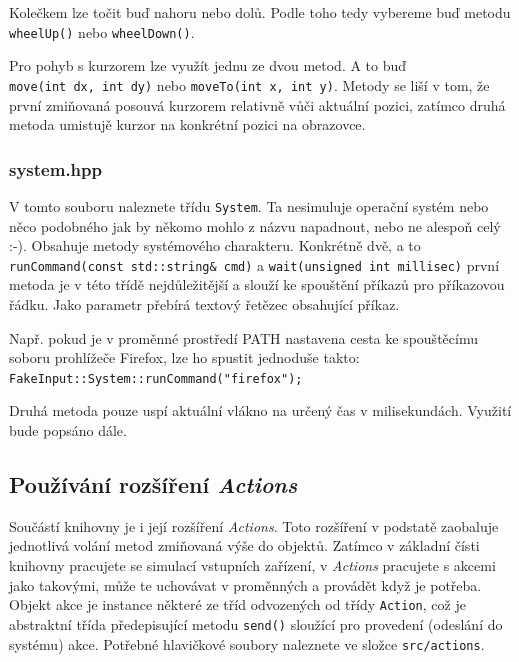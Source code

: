 \documentclass[12pt]{article}
\newcommand{\code}[1]{\texttt{#1}}
\begin{document}
    Kolečkem lze točit buď nahoru nebo dolů. Podle toho tedy vybereme buď metodu \code{wheelUp()} nebo \code{wheelDown()}.

    Pro pohyb s kurzorem lze využít jednu ze dvou metod. A to buď\\ \code{move(int dx, int dy)} nebo \code{moveTo(int x, int y)}. Metody se liší v tom, že první zmiňovaná posouvá kurzorem relativně vůči aktuální pozici, zatímco druhá metoda umistujě kurzor na konkrétní pozici na obrazovce.

    \subsubsection{system.hpp}
    V tomto souboru naleznete třídu \code{System}. Ta nesimuluje operační systém nebo něco podobného jak by někomo mohlo z názvu napadnout, nebo ne alespoň celý :-). Obsahuje metody systémového charakteru. Konkrétně dvě, a to \code{runCommand(const std::string\& cmd)} a \code{wait(unsigned int millisec)} první metoda je v této třídě nejdůležitější a slouží ke spouštění příkazů pro příkazovou řádku. Jako parametr přebírá textový řetězec obsahující příkaz.
    
        \begin{center}
            \begin{minipage}{0.7\textwidth}
                Např. pokud je v proměnné prostředí PATH nastavena cesta ke spouštěcímu soboru prohlížeče Firefox,
                lze ho spustit jednoduše takto:
                \code{FakeInput::System::runCommand("firefox");}
            \end{minipage}
        \end{center}

    Druhá metoda pouze uspí aktuální vlákno na určený čas v milisekundách. Využití bude popsáno dále.

    \subsection{Používání rozšíření \emph{Actions}}
    Součástí knihovny je i její rozšíření \emph{Actions}. Toto rozšíření v podstatě zaobaluje jednotlivá volání metod zmiňovaná výše do objektů. Zatímco v základní čísti knihovny pracujete se simulací vstupních zařízení, v \emph{Actions} pracujete s akcemi jako takovými, může te uchovávat v proměnných a provádět když je potřeba. Objekt akce je instance některé ze tříd odvozených od třídy \code{Action}, což je abstraktní třída předepisující metodu \code{send()} sloužící pro provedení (odeslání do systému) akce. Potřebné hlavičkové soubory naleznete ve složce \code{src/actions}.
\end{document}

